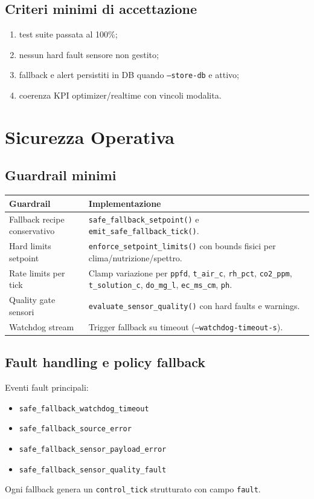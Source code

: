 ﻿\documentclass[11pt,a4paper]{report}
\begin{document}
\section{Criteri minimi di accettazione}
\begin{enumerate}
  \item test suite passata al 100\%;
  \item nessun hard fault sensore non gestito;
  \item fallback e alert persistiti in DB quando \texttt{--store-db} e attivo;
  \item coerenza KPI optimizer/realtime con vincoli modalita.
\end{enumerate}

\newpage
\chapter{Sicurezza Operativa}

\section{Guardrail minimi}
\begin{longtable}{@{}p{4.6cm}p{8.6cm}@{}}
\toprule
Guardrail & Implementazione \\ \midrule
Fallback recipe conservativo & \texttt{safe\_fallback\_setpoint()} e \texttt{emit\_safe\_fallback\_tick()}. \\
Hard limits setpoint & \texttt{enforce\_setpoint\_limits()} con bounds fisici per clima/nutrizione/spettro. \\
Rate limits per tick & Clamp variazione per \texttt{ppfd}, \texttt{t\_air\_c}, \texttt{rh\_pct}, \texttt{co2\_ppm}, \texttt{t\_solution\_c}, \texttt{do\_mg\_l}, \texttt{ec\_ms\_cm}, \texttt{ph}. \\
Quality gate sensori & \texttt{evaluate\_sensor\_quality()} con hard faults e warnings. \\
Watchdog stream & Trigger fallback su timeout (\texttt{--watchdog-timeout-s}). \\
\bottomrule
\end{longtable}

\section{Fault handling e policy fallback}
Eventi fault principali:
\begin{itemize}
  \item \texttt{safe\_fallback\_watchdog\_timeout}
  \item \texttt{safe\_fallback\_source\_error}
  \item \texttt{safe\_fallback\_sensor\_payload\_error}
  \item \texttt{safe\_fallback\_sensor\_quality\_fault}
\end{itemize}
Ogni fallback genera un \texttt{control\_tick} strutturato con campo \texttt{fault}.
\end{document}

